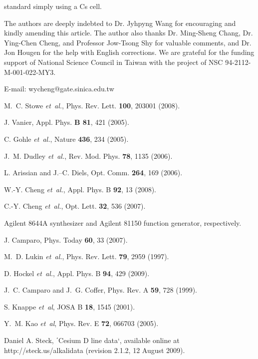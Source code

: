 standard simply using a Cs cell.    

The authors are deeply indebted to Dr. Jyhpyng Wang for encouraging and kindly amending this article.  The author also thanks Dr. Ming-Sheng Chang, Dr. Ying-Chen Cheng, and Professor Jow-Tsong Shy for valuable comments, and Dr. Jon Hougen for the help with English corrections. We are grateful for the funding support of National Science Council in Taiwan with the project of NSC 94-2112-M-001-022-MY3.



\begin{references}

 E-mail: wycheng@gate.sinica.edu.tw

 M.~C. Stowe {\it et~al.}, Phys. Rev. Lett. {\bf 100}, 203001 (2008).

 J. Vanier, Appl. Phys. {\bf B 81}, 421 (2005).

 C. Gohle {\it et~al.}, Nature {\bf 436}, 234 (2005).

 J.~M. Dudley {\it et~al.}, Rev. Mod. Phys. {\bf 78}, 1135 (2006).

 L. Arissian and J.–C. Diels, Opt. Comm. {\bf 264}, 169 (2006).

 W.-Y. Cheng {\it et~al.}, Appl. Phys. B {\bf 92}, 13 (2008).

 C.-Y. Cheng {\it et~al.}, Opt. Lett. {\bf 32}, 536 (2007).

 Agilent 8644A synthesizer and Agilent 81150 function generator, respectively.

 J. Camparo, Phys. Today {\bf 60}, 33 (2007).

 M.~D. Lukin {\it et~al.}, Phys. Rev. Lett. {\bf 79}, 2959 (1997).

 D. Hockel {\it et~al.}, Appl. Phys. B {\bf 94}, 429 (2009).

 J.~C. Camparo and J.~G. Coffer, Phys. Rev. A {\bf 59}, 728 (1999).

 S. Knappe {\it et~al}, JOSA B {\bf 18}, 1545 (2001).

 Y.~M. Kao {\it et~al}, Phys. Rev. E {\bf 72}, 066703 (2005).

 Daniel A. Steck, ΄Cesium D line data‘, available online at http://steck.us/alkalidata (revision 2.1.2, 12 August 2009).





\end{references}
